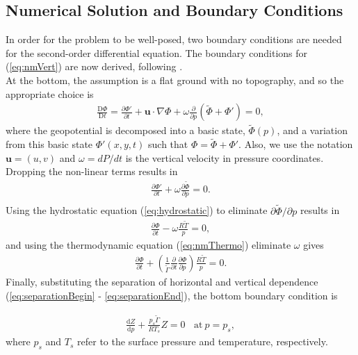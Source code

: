 \subsection{Numerical Solution and Boundary Conditions}
\label{sec:normalModes}
In order for the problem to be well-posed, two boundary conditions are needed for the second-order differential equation. The boundary conditions for (\ref{eq:nmVert}) are now derived, following \cite{Daley1991}.\\

At the bottom, the assumption is a flat ground with no topography, and so the appropriate choice is 
\begin{align}
\frac{\text{D} \Phi}{\text{D} t}  = \frac{\partial \Phi'}{\partial t} + \mathbf{u} \cdot \nabla \Phi + \omega \frac{\partial}{\partial p} (\tilde{\Phi} + \Phi') = 0,
\end{align}
where the geopotential is decomposed into a basic state, $\tilde{\Phi}(p)$, and a variation from this basic state $\Phi'(x,y,t)$ such that $\Phi = \tilde{\Phi} + \Phi'$. Also, we use the notation $\mathbf{u} = (u,v)$ and $\omega = dP/dt$ is the vertical velocity in pressure coordinates. Dropping the non-linear terms results in
\begin{align}
\frac{\partial \Phi'}{\partial t} + \omega \frac{\partial \tilde{\Phi}}{\partial p} = 0.\\
\end{align}
Using the hydrostatic equation (\ref{eq:hydrostatic}) to eliminate $\partial \tilde{\Phi}/\partial p$ results in
\begin{align}
\frac{\partial \Phi}{\partial t}  - \omega \frac{R\tilde{T}}{p} = 0,
\end{align}
and using the thermodynamic equation (\ref{eq:nmThermo}) eliminate $\omega$ gives
\begin{align}
\frac{\partial \Phi}{\partial t}  + \left(\frac{1}{\tilde{\Gamma}} \frac{\partial}{\partial t} \frac{\partial \Phi}{\partial p}\right) \frac{R\tilde{T}}{p} = 0.
\end{align}
Finally, substituting the separation of horizontal and vertical dependence (\ref{eq:separationBegin} - \ref{eq:separationEnd}), the bottom boundary condition is 

\begin{align}
\frac{\text{d}Z}{\text{d}p} + \frac{p_s\tilde{\Gamma}}{RT_s} Z = 0 ~~~~\text{at}~ p = p_s,\label{eq:BCbot}
\end{align}
where $p_s$ and $T_s$ refer to the surface pressure and temperature, respectively.\\


